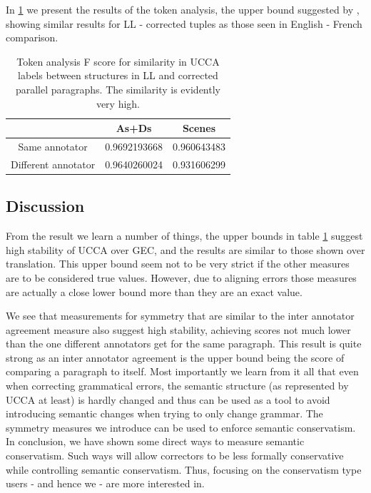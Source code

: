 \documentclass[english]{article}
\begin{document}
	In \ref{tab:Token_analysis} we present the results of the token analysis, the
	upper bound suggested by \cite{sulem2015conceptual}, showing similar
	results for LL - corrected tuples as those seen in English
	- French comparison.
		
		\begin{table}[h!]
			\centering
			\label{tab:Token_analysis}
			\begin{tabular}{c|c|c}
				& As+Ds & Scenes\\
				\hline
				Same annotator & 0.9692193668 & 0.960643483\\
				Different annotator & 0.9640260024
				 & 0.931606299
				 \\
				\end{tabular}
				\caption{Token analysis F score for similarity in UCCA labels between structures in LL and corrected parallel paragraphs. The similarity is evidently very high.}
				\end{table}
				
	\subsection{Discussion}
	
	From the result we learn a number of things, the upper
	bounds in table \ref{tab:Token_analysis} suggest high stability of UCCA over GEC, and the results are similar to those shown over
	translation. This upper bound seem not to be very strict if the other
	measures are to be considered true values. 
	However, due to aligning errors those measures are actually a close lower bound more than they are an exact value.
	
	We see that measurements for symmetry that are similar to the inter
	annotator agreement measure also suggest high stability, achieving
	scores not much lower than the one different annotators get for the
	same paragraph. This result is quite strong as an inter annotator
	agreement is the upper bound being the score of comparing a paragraph to itself. 
	Most importantly we learn from it all that even when correcting grammatical errors, the semantic structure (as represented by UCCA at least) is hardly changed and thus can be used as a tool to avoid introducing semantic changes when trying to only change grammar. 
	The symmetry measures we introduce can be used to enforce semantic conservatism.
	In conclusion, we have shown some direct ways to measure
	semantic conservatism. Such ways will allow correctors to be less formally conservative while controlling semantic conservatism. Thus, focusing on the conservatism type users - and hence we - are more interested in.
\end{document}
